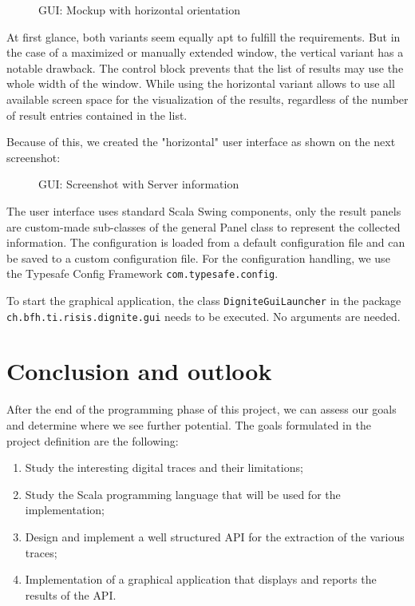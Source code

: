 \documentclass[
	a4paper,					10pt,							twoside,					openright,				notitlepage,			parskip=half,			]{scrreprt}
\begin{document}
\begin{figure}[H] 
\caption{\gls{GUI}: Mockup with horizontal orientation}
\label{fig:guimockhoriz}
\end{figure}

At first glance, both variants seem equally apt to fulfill the requirements. But in the
case of a maximized or manually extended window, the vertical variant has a notable drawback.
The control block prevents that the list of results may use the whole width of the window. 
While using the horizontal variant allows to use all available screen space for the visualization
of the results, regardless of the number of result entries contained in the list.

Because of this, we created the "horizontal" user interface as shown on the next screenshot: 

\begin{figure}[H] 
\caption{\gls{GUI}: Screenshot with Server information}
\label{fig:gui}
\end{figure}

The user interface uses standard Scala Swing components, only the result panels are custom-made 
sub-classes of the general Panel class to represent the collected information. The configuration
is loaded from a default configuration file and can be saved to a custom configuration file. For
the configuration handling, we use the Typesafe Config Framework \verb|com.typesafe.config|.

To start the graphical application, the class \verb|DigniteGuiLauncher| in the package \verb|ch.bfh.ti.risis.dignite.gui|
needs to be executed. No arguments are needed.\clearpage{}
\clearpage{}

\chapter{Conclusion and outlook} \label{chap:conclusion}



After the end of the programming phase of this project, we can assess our goals and determine where we see further potential.
The goals formulated in the project definition are the following:

\begin{enumerate}
\item{Study the interesting digital traces and their limitations;}
\item{Study the Scala programming language that will be used for the implementation;}
\item{Design and implement a well structured \gls{API} for the extraction of the various traces;}
\item{Implementation of a graphical application that displays and reports the results of the \gls{API}.}
\end{enumerate}
\end{document}

